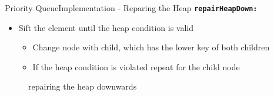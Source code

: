 \begin{frame}{Priority Queue}{Implementation - Reparing the Heap}
  {\color{Mittel-Blau}\texttt{\textbf{repairHeapDown:}}}
  \begin{itemize}
    \item
      {\color{Mittel-Blau}Sift} the element until the
      {\color{Mittel-Blau}heap condition} is valid
      \begin{itemize}
        \item
          Change node with child, which has the lower key of both children
        \item
          If the {\color{Mittel-Blau}heap condition} is violated repeat for
          the child node
      \end{itemize}
  \end{itemize}
  \begin{center}
    \begin{figure}[!h]%
      \begin{columns}%
        \begin{column}{0.45\linewidth}%
          \begin{adjustbox}{width=\linewidth}%
          \end{adjustbox}%
        \end{column}%
        \begin{column}{0.45\linewidth}%
          \begin{adjustbox}{width=\linewidth}%
          \end{adjustbox}%
        \end{column}%
      \end{columns}%
      \caption{repairing the heap downwards}%
      \label{fig:priority_queue:impl_repair_heap_down2}%
    \end{figure}
  \end{center}
\end{frame}


